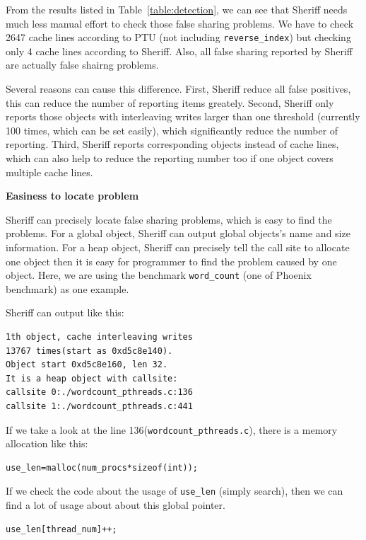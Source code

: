 From the results listed in Table~\ref{table:detection}, we can see that Sheriff needs much less manual effort
to check those false sharing problems. We have to check 2647 cache lines 
according to PTU (not including \texttt{reverse\_index}) but checking only 4 cache lines according to Sheriff.
Also, all false sharing reported by Sheriff are actually false shairng problems. 

Several reasons can cause this difference. 
First, Sheriff reduce all false positives, this can reduce the number of reporting items greately. 
Second, Sheriff only reports those objects with interleaving writes larger than one threshold
(currently 100 times, which can be set easily), which significantly reduce the number of reporting.
Third, Sheriff reports corresponding objects instead of cache lines, which can also help to reduce the
reporting number too if one object covers multiple cache lines. 
\par\vspace{3mm}
\noindent
\textbf{Easiness to locate problem}
\par\vspace{3mm}
\noindent
Sheriff can precisely locate false sharing problems, which is easy to find the problems. 
For a global object, Sheriff can output global objects's name and size information. 
For a heap object, Sheriff can precisely tell the call site to allocate one object then it is easy
for programmer to find the problem caused by one object. 
Here, we are using the benchmark \texttt{word\_count} (one of Phoenix benchmark) as one example.

Sheriff can output like this:
\begin{verbatim} 
1th object, cache interleaving writes 
13767 times(start as 0xd5c8e140). 
Object start 0xd5c8e160, len 32. 
It is a heap object with callsite:
callsite 0:./wordcount_pthreads.c:136
callsite 1:./wordcount_pthreads.c:441
\end{verbatim}

If we take a look at the line 136(\texttt{wordcount\_pthreads.c}), 
there is a memory allocation like this:
\begin{verbatim}
use_len=malloc(num_procs*sizeof(int));
\end{verbatim}

If we check the code about the usage of \texttt{use\_len} (simply search), 
then we can find a lot of usage about 
about this global pointer. 
\begin{verbatim}
use_len[thread_num]++;
\end{verbatim}

